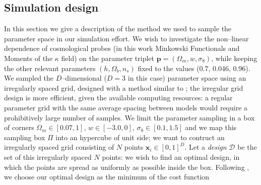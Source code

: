 \documentclass[reprint,aps,prd,superscriptaddress,showkeys,showpacs]{revtex4-1}
\begin{document}
\subsection{Simulation design}
In this section we give a description of the method we used to sample the parameter space in our simulation effort. We wish to investigate the non--linear dependence of cosmological probes (in this work Minkowski Functionals and Moments of the $\kappa$ field) on the parameter triplet $\mathbf{p}=(\Omega_m,w,\sigma_8)$, while keeping the other relevant parameters $(h,\Omega_b,n_s)$ fixed to the values (0.7, 0.046, 0.96). We sampled the $D$--dimensional ($D=3$ in this case) parameter space using an irregularly spaced grid, designed with a method similar to \citep{coyote2}; the irregular grid design is more efficient, given the available computing resources: a regular parameter grid with the same average spacing between models would require a prohibitively large number of samples. We limit the parameter sampling in a box of corners $\Omega_m\in[0.07,1],\,w\in[-3.0,0],\,\sigma_8\in[0.1,1.5]$ and we map this sampling box $\Pi$ into an hypercube of unit side; we want to contruct an irregularly spaced grid consisting of $N$ points $\mathbf{x}_i\in[0,1]^D$. Let a \textit{design} $\mathcal{D}$ be the set of this irregularly spaced $N$ points: we wish to find an optimal design, in which the points are spread as uniformly as possible inside the box. Following \citep{coyote2}, we choose our optimal design as the minimum of the cost function

\end{document}
